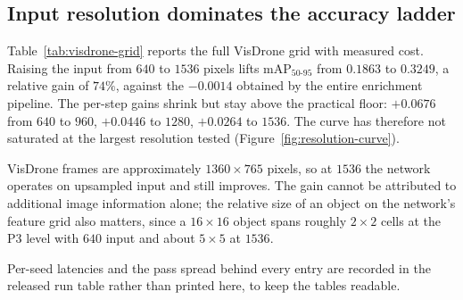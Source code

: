 \subsection{Input resolution dominates the accuracy ladder}
\label{sec:results:resolution}

Table~\ref{tab:visdrone-grid} reports the full VisDrone grid with measured cost. Raising the
input from $640$ to $1536$ pixels lifts mAP$_{50\text{-}95}$ from $0.1863$ to $0.3249$, a
relative gain of $74\%$, against the $-0.0014$ obtained by the entire enrichment pipeline.
The per-step gains shrink but stay above the practical floor: $+0.0676$ from $640$ to $960$,
$+0.0446$ to $1280$, $+0.0264$ to $1536$. The curve has therefore not saturated at the
largest resolution tested (Figure~\ref{fig:resolution-curve}).

VisDrone frames are approximately $1360 \times 765$ pixels, so at $1536$ the network operates
on upsampled input and still improves. The gain cannot be attributed to additional image
information alone; the relative size of an object on the network's feature grid also
matters, since a $16 \times 16$ object spans roughly $2 \times 2$ cells at the P3 level with
$640$ input and about $5 \times 5$ at $1536$.

Per-seed latencies and the pass spread behind every entry are recorded in the released
run table rather than printed here, to keep the tables readable.

